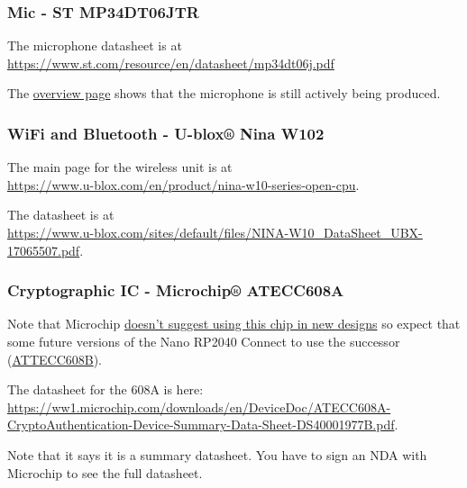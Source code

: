 \subsubsection{Mic - ST MP34DT06JTR}
The microphone datasheet is at \\
\href{https://www.st.com/resource/en/datasheet/mp34dt06j.pdf}{https://www.st.com/resource/en/datasheet/mp34dt06j.pdf}

The \href{https://www.st.com/en/mems-and-sensors/mp34dt06j.html#sample-buy}{overview page} shows that the microphone is still actively being produced.

\subsubsection{WiFi and Bluetooth - U-blox® Nina W102}
The main page for the wireless unit is at \\
\href{https://www.u-blox.com/en/product/nina-w10-series-open-cpu}{https://www.u-blox.com/en/product/nina-w10-series-open-cpu}.

The datasheet is at \\
\href{https://www.u-blox.com/sites/default/files/NINA-W10\_DataSheet\_UBX-17065507.pdf}{https://www.u-blox.com/sites/default/files/NINA-W10\_DataSheet\_UBX-17065507.pdf}.

\subsubsection{Cryptographic IC - Microchip® ATECC608A}
Note that Microchip \href{https://www.microchip.com/en-us/product/ATECC608A}{doesn't suggest using this chip in new designs} so expect that some future versions of the
Nano RP2040 Connect to use the successor (\href{https://www.microchip.com/en-us/product/ATECC608B}{ATTECC608B}).

The datasheet for the 608A is here: \\
\href{https://ww1.microchip.com/downloads/en/DeviceDoc/ATECC608A-CryptoAuthentication-Device-Summary-Data-Sheet-DS40001977B.pdf}{https://ww1.microchip.com/downloads/en/DeviceDoc/ATECC608A-CryptoAuthentication-Device-Summary-Data-Sheet-DS40001977B.pdf}.

Note that it says it is a summary datasheet. You have to sign an NDA with Microchip to see the full datasheet.

